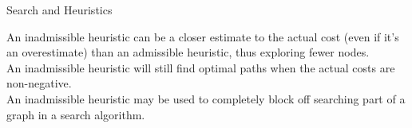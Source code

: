\begin{problem} {Search and Heuristics}
\begin{question}[3]
\solution{\emptysquare}{\OnehB} An inadmissible heuristic can be a closer estimate to the actual cost (even if it’s an overestimate) than an admissible heuristic, thus exploring fewer nodes. \\

\solution{\emptysquare}{\OnehC} An inadmissible heuristic will still find optimal paths when the actual costs are non-negative. \\

\solution{\emptysquare}{\OnehD} An inadmissible heuristic may be used to completely block off searching part of a graph in a search algorithm.

\solution{}{\OneIReason} 
\end{question}

\end{problem}

